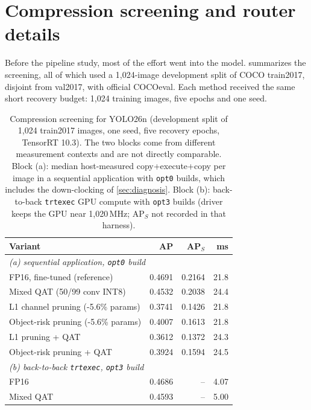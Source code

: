 \section{Compression screening and router details}
\label{app:compression}
\suppressfloats[t]

Before the pipeline study, most of the effort went into the model.
 summarizes the screening, all of which used a
1,024-image development split of COCO train2017, disjoint from val2017,
with official COCOeval. Each method received the same short recovery
budget: 1,024 training images, five epochs and one seed.

\begin{table}[b]
\centering
\caption{Compression screening for YOLO26n (development split of 1,024
train2017 images, one seed, five recovery epochs, TensorRT 10.3). The two
blocks come from different measurement contexts and are not directly
comparable. Block (a): median host-measured copy+execute+copy per image
in a sequential application with \texttt{opt0} builds, which includes
the down-clocking of \cref{sec:diagnosis}. Block (b): back-to-back
\texttt{trtexec} GPU compute with \texttt{opt3} builds (driver keeps the
GPU near 1,020\,MHz; AP$_S$ not recorded in that harness).}
\label{tab:compression}
\small
\setlength{\tabcolsep}{3pt}
\begin{tabular}{lrrr}
\toprule
Variant & AP & AP$_S$ & ms \\
\midrule
\multicolumn{4}{l}{\emph{(a) sequential application, \texttt{opt0} build}} \\
FP16, fine-tuned (reference) & 0.4691 & 0.2164 & 21.8 \\
Mixed QAT (50/99 conv INT8) & 0.4532 & 0.2038 & 24.4 \\
L1 channel pruning (-5.6\% params) & 0.3741 & 0.1426 & 21.8 \\
Object-risk pruning (-5.6\% params) & 0.4007 & 0.1613 & 21.8 \\
L1 pruning + QAT & 0.3612 & 0.1372 & 24.3 \\
Object-risk pruning + QAT & 0.3924 & 0.1594 & 24.5 \\
\midrule
\multicolumn{4}{l}{\emph{(b) back-to-back \texttt{trtexec}, \texttt{opt3} build}} \\
FP16 & 0.4686 & -- & 4.07 \\
Mixed QAT & 0.4593 & -- & 5.00 \\
\bottomrule
\end{tabular}
\end{table}

